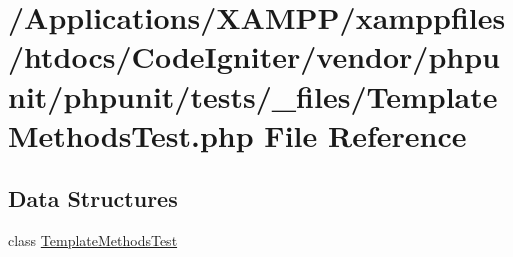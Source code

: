 \hypertarget{_template_methods_test_8php}{}\section{/\+Applications/\+X\+A\+M\+P\+P/xamppfiles/htdocs/\+Code\+Igniter/vendor/phpunit/phpunit/tests/\+\_\+files/\+Template\+Methods\+Test.php File Reference}
\label{_template_methods_test_8php}
\subsection*{Data Structures}
\begin{DoxyCompactItemize}
\item 
class \mbox{\hyperlink{class_template_methods_test}{Template\+Methods\+Test}}
\end{DoxyCompactItemize}
